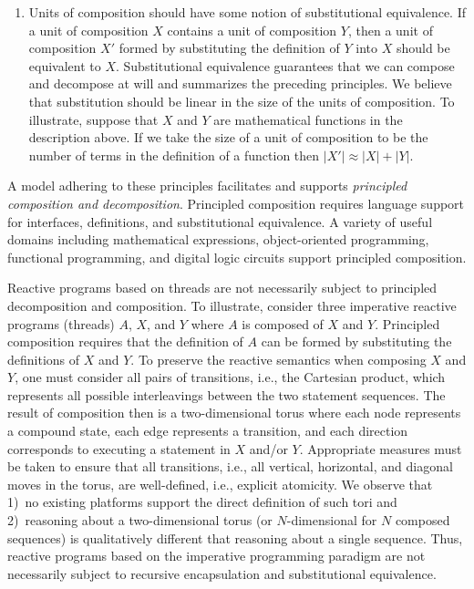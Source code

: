 \begin{enumerate}
\item Units of composition should have some notion of substitutional equivalence.
If a unit of composition $X$ contains a unit of composition $Y$, then a unit of composition $X'$ formed by substituting the definition of $Y$ into $X$ should be equivalent to $X$.
Substitutional equivalence guarantees that we can compose and decompose at will and summarizes the preceding principles.
We believe that substitution should be linear in the size of the units of composition.
To illustrate, suppose that $X$ and $Y$ are mathematical functions in the description above. %
If we take the size of a unit of composition to be the number of terms in the definition of a function then $|X'| \approx |X| + |Y|$.
\end{enumerate}
A model adhering to these principles facilitates and supports \emph{principled composition and decomposition}.
Principled composition requires language support for interfaces, definitions, and substitutional equivalence.
A variety of useful domains including mathematical expressions, object-oriented programming, functional programming, and digital logic circuits support principled composition.

Reactive programs based on threads are not necessarily subject to principled decomposition and composition.
To illustrate, consider three imperative reactive programs (threads) $A$, $X$, and $Y$ where $A$ is composed of $X$ and $Y$.
Principled composition requires that the definition of $A$ can be formed by substituting the definitions of $X$ and $Y$.
To preserve the reactive semantics when composing $X$ and $Y$, one must consider all pairs of transitions, i.e., the Cartesian product, which represents all possible interleavings between the two statement sequences.
The result of composition then is a two-dimensional torus where each node represents a compound state, each edge represents a transition, and each direction corresponds to executing a statement in $X$ and/or $Y$.
Appropriate measures must be taken to ensure that all transitions, i.e., all vertical, horizontal, and diagonal moves in the torus, are well-defined, i.e., explicit atomicity.
We observe that 1)~no existing platforms support the direct definition of such tori and 2)~reasoning about a two-dimensional torus (or $N$-dimensional for $N$ composed sequences) is qualitatively different that reasoning about a single sequence.
Thus, reactive programs based on the imperative programming paradigm are not necessarily subject to recursive encapsulation and substitutional equivalence.

